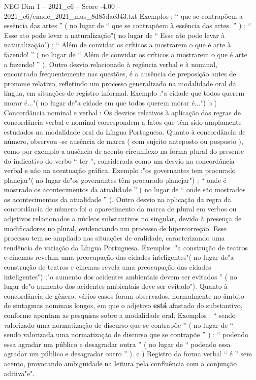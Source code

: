 \begin{textsample}{NEG Dim 1 – 2021\_c6 – Score -4.00 – 2021\_c6/enade\_2021\_mus\_8d85dac343.txt}
Exemplos : “ que se contrapõem a essência das artes ” ( no lugar de “ que se contrapõem à essência das artes. ” ) ; “ Esse ato pode levar a naturalização"( no lugar de “ Esse ato pode levar à naturalização") ; “ Além de convidar os críticos a mostrarem o que é arte à fazendo! ” ( no lugar de “ Além de convidar os críticos a mostrarem o que é arte a fazendo! ” ).
Outro desvio relacionado à regência verbal e à nominal, encontrado frequentemente nas questões, é a ausência de preposição antes de pronome relativo, refletindo um processo generalizado na modalidade oral da língua, em situações de registro informal.
Exemplo :"a cidade que todos querem morar é..."( no lugar de"a cidade em que todos querem morar é...") b ) Concordância nominal e verbal : Os desvios relativos à aplicação das regras de concordância verbal e nominal correspondem a fatos que têm sido amplamente estudados na modalidade oral da Língua Portuguesa.
Quanto à concordância de número, observou -se ausência de marca ( com sujeito anteposto ou posposto ), como por exemplo a ausência de acento circunflexo na forma plural do presente do indicativo do verbo “ ter ”, considerada como um desvio na concordância verbal e não na acentuação gráfica.
Exemplo :"os governantes tem procurado planejar"( no lugar de"os governantes têm procurado planejar") ; “ onde é mostrado os acontecimentos da atualidade ” ( no lugar de “ onde são mostrados os acontecimentos da atualidade ” ).
Outro desvio na aplicação da regra da concordância de número foi o aparecimento da marca de plural em verbos ou adjetivos relacionados a núcleos substantivos no singular, devido à presença de modificadores no plural, evidenciando um processo de hipercorreção.
Esse processo tem se ampliado nas situações de oralidade, caracterizando uma tendência de variação da Língua Portuguesa.
Exemplos :"a construção de teatros e cinemas revelam uma preocupação das cidades inteligentes"( no lugar de"a construção de teatros e cinemas revela uma preocupação das cidades inteligentes") ;"o aumento dos acidentes ambientais devem ser evitados ” ( no lugar de"o aumento dos acidentes ambientais deve ser evitado").
Quanto à concordância de gênero, vários casos foram observados, normalmente no âmbito de sintagmas nominais longos, em que o adjetivo \textbf{está} afastado do substantivo, conforme apontam as pesquisas sobre a modalidade oral.
Exemplos : “ sendo valorizado uma normatização de discurso que se contrapõe ” ( no lugar de “ sendo valorizada uma normatização de discurso que se contrapõe ” ) ; “ podendo essa agradar um público e desagradar outra ” ( no lugar de “ podendo essa agradar um público e desagradar outro ” ). c ) Registro da forma verbal “ é ” sem acento, provocando ambiguidade na leitura pela confluência com a conjunção aditiva"e".

\end{textsample}
